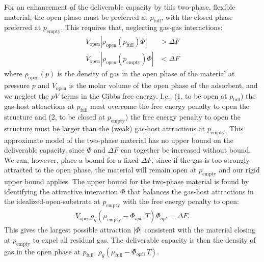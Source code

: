 \documentclass[twoside,twocolumn,9pt]{article}
\newcommand\V{\Phi}
\newcommand\pfull{\ensuremath{p_{\text{full}}}}
\newcommand\pempty{\ensuremath{p_{\text{empty}}}}
\newcommand\mufull{\ensuremath{\mu_{\text{full}}}}
\newcommand\muempty{\ensuremath{\mu_{\text{empty}}}}
\begin{document}
For an enhancement of the deliverable capacity by this two-phase, flexible material, 
the open phase must be preferred at $\pfull$, with the closed phase preferred at $\pempty$. 
This requires that, neglecting gas-gas interactions:
\begin{align}
    V_{\text{open}}|\rho_{\text{open}}(\pfull)\V| &> \Delta F \\
    V_{\text{open}}|\rho_{\text{open}}(\pempty)\V| &< \Delta F
\end{align}
where $\rho_{\text{open}}(p)$ is the density of gas
in the open phase of the material at pressure $p$ and $V_{\text{open}}$ is the molar volume of the open phase of the adsorbent, and we neglect the $pV$
terms in the Gibbs free energy.
I.e., (1, to be open at $\pfull$) the gas-host attractions at $\pfull$ must overcome the free energy penalty to open the structure and 
(2, to be closed at $\pempty$) the free energy penalty to open the structure must be larger than the (weak) gas-host attractions at $\pempty$.
This approximate model of the two-phase material has no upper bound on the deliverable capacity, since
$\V$ and $\Delta F$ can together be increased without bound.
We can, however, place a bound for a fixed $\Delta F$, since if the gas is too strongly attracted to the open phase,
the material will remain open at $\pempty$ and our rigid upper bound applies.
The upper bound for the two-phase material is found by identifying the
attractive interaction $\V$ that balances the gas-host attractions in the idealized-open-substrate at $\pempty$ with the free energy penalty to open:
\begin{align}
    V_{\text{open}} \rho_g(\muempty{} - \V_{opt}, T)\V_{opt} = \Delta F.
\end{align}
This gives the largest possible attraction $|\V|$ consistent with the material closing
at $\pempty$ to expel all residual gas. 
The deliverable capacity is then the density of gas in the open phase at $\pfull$, $\rho_g(\mufull{} - \V_{opt}, T)$.
\end{document}
